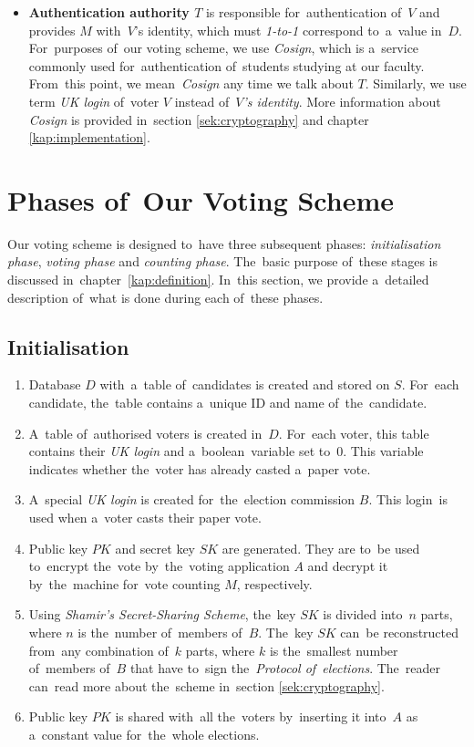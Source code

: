 \begin{itemize}
\item \textbf{Authentication authority $T$} is responsible for~authentication of~$V$ and provides $M$ with~$V$'s identity, which must \emph{1-to-1} correspond to~a~value in~$D$. For~purposes of~our voting scheme, we use \emph{Cosign}, which is a~service commonly used for~authentication of~students studying at our faculty. From~this point, we mean~\emph{Cosign} any time we talk about $T$. Similarly, we use term \emph{UK login} of~voter $V$ instead of~\emph{$V$'s identity}. More information about \emph{Cosign} is provided in~section \ref{sek:cryptography}  and chapter \ref{kap:implementation}.
\end{itemize}

\section{Phases of~Our Voting Scheme}
Our voting scheme is designed to~have three subsequent phases: \emph{initialisation phase}, \emph{voting phase} and \emph{counting phase}. The~basic purpose of~these stages is discussed in~chapter~\ref{kap:definition}. In~this section, we provide a~detailed description of~what is done during each of~these phases.

\subsection{Initialisation}
\begin{enumerate}
\item Database $D$ with~a~table of~candidates is created and stored on $S$. For~each candidate, the~table contains a~unique ID and name of~the~candidate.
\item A~table of~authorised voters is created in~$D$. For~each voter, this table contains their \emph{UK login} and a~boolean~variable set to~0. This variable indicates whether the~voter has already casted a~paper vote.
\item A~special \emph{UK login} is created for~the~election commission $B$. This login~is used when a~voter casts their paper vote.
\item Public key $PK$ and secret key $SK$ are generated. They are to~be used to~encrypt the~vote by~the~voting application $A$ and decrypt it by~the~machine for~vote counting $M$, respectively.
\item Using \emph{Shamir's Secret-Sharing Scheme}, the~key $SK$ is divided into~$n$ parts, where $n$ is the~number of~members of~$B$. The~key $SK$ can~be reconstructed from~any combination of~$k$ parts, where $k$ is the~smallest number of~members of~$B$ that have to~sign the~\emph{Protocol of~elections}. The~reader can~read more about the~scheme in~section \ref{sek:cryptography}.
\item Public key $PK$ is shared with~all the~voters by~inserting it into~$A$ as a~constant value for~the~whole elections.
\end{enumerate}


